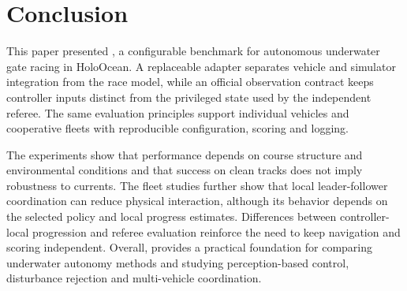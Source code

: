 \section{Conclusion}
\label{sec:conclusion}

This paper presented \mra{}, a configurable benchmark for autonomous underwater gate racing in HoloOcean. A replaceable adapter separates vehicle and simulator integration from the race model, while an official observation contract keeps controller inputs distinct from the privileged state used by the independent referee. The same evaluation principles support individual vehicles and cooperative fleets with reproducible configuration, scoring and logging.

The experiments show that performance depends on course structure and environmental conditions and that success on clean tracks does not imply robustness to currents. The fleet studies further show that local leader-follower coordination can reduce physical interaction, although its behavior depends on the selected policy and local progress estimates. Differences between controller-local progression and referee evaluation reinforce the need to keep navigation and scoring independent. Overall, \mra{} provides a practical foundation for comparing underwater autonomy methods and studying perception-based control, disturbance rejection and multi-vehicle coordination.
